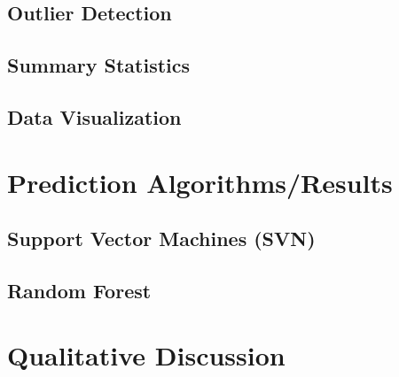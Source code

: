 \documentclass{article}
\begin{document}
    \subsection*{Outlier Detection}
    \hspace{\parindent} 

    
    \subsection*{Summary Statistics}
    \hspace{\parindent} 

    
    \subsection*{Data Visualization}
    \hspace{\parindent} 

    
\section*{Prediction Algorithms/Results}
    \subsection*{Support Vector Machines (SVN)}
    \hspace{\parindent} 


    \subsection*{Random Forest}
    \hspace{\parindent} 

    
\section*{Qualitative Discussion}
\hspace{\parindent} 

    
\end{document}
